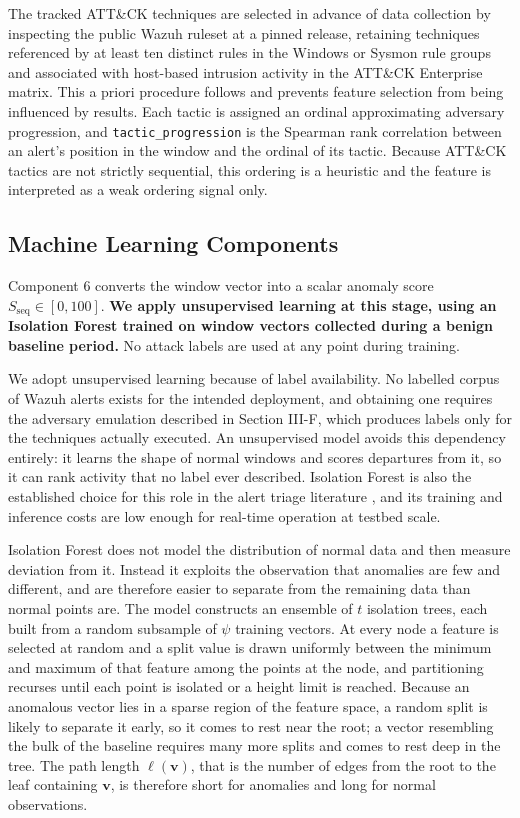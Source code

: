 \documentclass[conference]{IEEEtran}
\begin{document}
The tracked ATT\&CK techniques are selected in advance of data collection by inspecting the public Wazuh ruleset at a pinned release, retaining techniques referenced by at least ten distinct rules in the Windows or Sysmon rule groups and associated with host-based intrusion activity in the ATT\&CK Enterprise matrix. This a priori procedure follows \cite{ref17} and prevents feature selection from being influenced by results. Each tactic is assigned an ordinal approximating adversary progression, and \texttt{tactic\_progression} is the Spearman rank correlation between an alert's position in the window and the ordinal of its tactic. Because ATT\&CK tactics are not strictly sequential, this ordering is a heuristic and the feature is interpreted as a weak ordering signal only.

\subsection{Machine Learning Components}

Component 6 converts the window vector into a scalar anomaly score $S_\mathrm{seq} \in [0,100]$. \textbf{We apply unsupervised learning at this stage, using an Isolation Forest \cite{ref20} trained on window vectors collected during a benign baseline period.} No attack labels are used at any point during training.

We adopt unsupervised learning because of label availability. No labelled corpus of Wazuh alerts exists for the intended deployment, and obtaining one requires the adversary emulation described in Section III-F, which produces labels only for the techniques actually executed. An unsupervised model avoids this dependency entirely: it learns the shape of normal windows and scores departures from it, so it can rank activity that no label ever described. Isolation Forest is also the established choice for this role in the alert triage literature \cite{ref5}, and its training and inference costs are low enough for real-time operation at testbed scale.

Isolation Forest does not model the distribution of normal data and then measure deviation from it. Instead it exploits the observation that anomalies are few and different, and are therefore easier to separate from the remaining data than normal points are. The model constructs an ensemble of $t$ isolation trees, each built from a random subsample of $\psi$ training vectors. At every node a feature is selected at random and a split value is drawn uniformly between the minimum and maximum of that feature among the points at the node, and partitioning recurses until each point is isolated or a height limit is reached. Because an anomalous vector lies in a sparse region of the feature space, a random split is likely to separate it early, so it comes to rest near the root; a vector resembling the bulk of the baseline requires many more splits and comes to rest deep in the tree. The path length $\ell(\mathbf{v})$, that is the number of edges from the root to the leaf containing $\mathbf{v}$, is therefore short for anomalies and long for normal observations.
\end{document}
